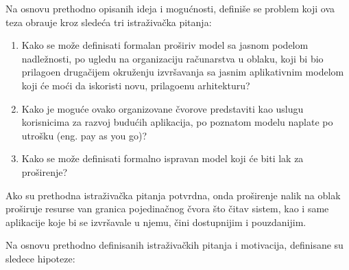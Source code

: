 Na osnovu prethodno opisanih ideja i mogu\'cnosti, defini\v se se problem koji ova teza obra\dj uje kroz slede\'ca tri istra\v ziva\v cka pitanja:

\begin{enumerate}[start=1,label={(\bfseries \arabic*)}]\label{rez:questions}
	\item Kako se mo\v ze definisati formalan pro\v siriv model sa jasnom podelom nadle\v znosti, po ugledu na organizaciju ra\v cunarstva u oblaku, koji bi bio prilago\dj en druga\v cijem okru\v zenju izvr\v savanja sa jasnim aplikativnim modelom koji \'ce moći da iskoristi novu, prilago\dj enu arhitekturu?
	\item Kako je mogu\'ce ovako organizovane \v cvorove predstaviti kao uslugu korisnicima za razvoj budu\'cih aplikacija, po poznatom modelu naplate po utro\v sku (eng. pay as you go)?
	\item Kako se mo\v ze definisati formalno ispravan model koji \'ce biti lak za pro\v sirenje?
\end{enumerate}

Ako su prethodna istra\v ziva\v cka pitanja potvrdna, onda pro\v sirenje nalik na oblak pro\v siruje resurse van granica pojedina\v cnog \v cvora \v sto \v citav sistem, kao i same aplikacije koje bi se izvr\v savale u njemu, \v cini dostupnijim i pouzdanijim.

Na osnovu prethodno definisanih istra\v ziva\v ckih pitanja i motivacija, definisane su sledece hipoteze:

